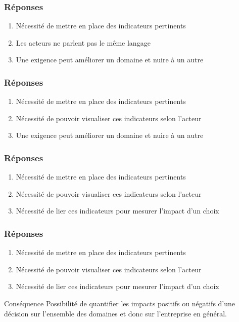 \documentclass{beamer}
\begin{document}
  \begin{frame}
   \frametitle{Réponses}
   \begin{enumerate}
    \item Nécessité de mettre en place des indicateurs pertinents
    \item Les acteurs ne parlent pas le même langage
    \item Une exigence peut améliorer un domaine et nuire à un autre
   \end{enumerate}
  \end{frame}
  
  \begin{frame}
   \frametitle{Réponses}
   \begin{enumerate}
    \item Nécessité de mettre en place des indicateurs pertinents
    \item Nécessité de pouvoir visualiser ces indicateurs selon l'acteur
    \item Une exigence peut améliorer un domaine et nuire à un autre
   \end{enumerate}
  \end{frame}
  
  \begin{frame}
   \frametitle{Réponses}
   \begin{enumerate}
    \item Nécessité de mettre en place des indicateurs pertinents
    \item Nécessité de pouvoir visualiser ces indicateurs selon l'acteur
    \item Nécessité de lier ces indicateurs pour mesurer l'impact d'un choix
   \end{enumerate}
  \end{frame}
  
  \begin{frame}
   \frametitle{Réponses}
   \begin{enumerate}
    \item Nécessité de mettre en place des indicateurs pertinents
    \item Nécessité de pouvoir visualiser ces indicateurs selon l'acteur
    \item Nécessité de lier ces indicateurs pour mesurer l'impact d'un choix
   \end{enumerate}
   \begin{block}{Conséquence}
    Possibilité de quantifier les impacts positifs ou négatifs d'une décision sur l'ensemble des domaines
    et donc sur l'entreprise en général.
   \end{block}
  \end{frame}
\end{document}
